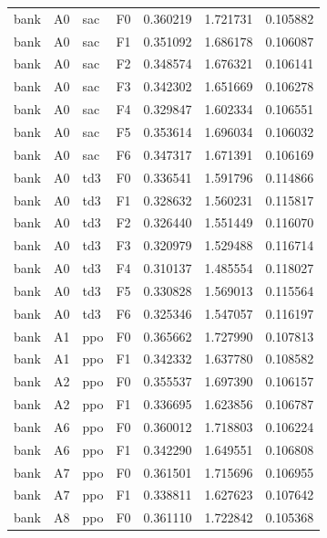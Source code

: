 \begin{tabular}{llllrrr}
      bank &      A0 &       sac &  F0 &  0.360219 &  1.721731 &  0.105882 \\
      bank &      A0 &       sac &  F1 &  0.351092 &  1.686178 &  0.106087 \\
      bank &      A0 &       sac &  F2 &  0.348574 &  1.676321 &  0.106141 \\
      bank &      A0 &       sac &  F3 &  0.342302 &  1.651669 &  0.106278 \\
      bank &      A0 &       sac &  F4 &  0.329847 &  1.602334 &  0.106551 \\
      bank &      A0 &       sac &  F5 &  0.353614 &  1.696034 &  0.106032 \\
      bank &      A0 &       sac &  F6 &  0.347317 &  1.671391 &  0.106169 \\
      bank &      A0 &       td3 &  F0 &  0.336541 &  1.591796 &  0.114866 \\
      bank &      A0 &       td3 &  F1 &  0.328632 &  1.560231 &  0.115817 \\
      bank &      A0 &       td3 &  F2 &  0.326440 &  1.551449 &  0.116070 \\
      bank &      A0 &       td3 &  F3 &  0.320979 &  1.529488 &  0.116714 \\
      bank &      A0 &       td3 &  F4 &  0.310137 &  1.485554 &  0.118027 \\
      bank &      A0 &       td3 &  F5 &  0.330828 &  1.569013 &  0.115564 \\
      bank &      A0 &       td3 &  F6 &  0.325346 &  1.547057 &  0.116197 \\
      bank &      A1 &       ppo &  F0 &  0.365662 &  1.727990 &  0.107813 \\
      bank &      A1 &       ppo &  F1 &  0.342332 &  1.637780 &  0.108582 \\
      bank &      A2 &       ppo &  F0 &  0.355537 &  1.697390 &  0.106157 \\
      bank &      A2 &       ppo &  F1 &  0.336695 &  1.623856 &  0.106787 \\
      bank &      A6 &       ppo &  F0 &  0.360012 &  1.718803 &  0.106224 \\
      bank &      A6 &       ppo &  F1 &  0.342290 &  1.649551 &  0.106808 \\
      bank &      A7 &       ppo &  F0 &  0.361501 &  1.715696 &  0.106955 \\
      bank &      A7 &       ppo &  F1 &  0.338811 &  1.627623 &  0.107642 \\
      bank &      A8 &       ppo &  F0 &  0.361110 &  1.722842 &  0.105368 \\

\end{tabular}

